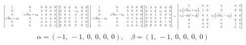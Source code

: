 \documentclass[11pt]{article}
\theoremstyle{definition}
\begin{document}
\[
\scaletoalign{\textwidth}{{\left[\begin{matrix}1 & 0 & 0 & 0 & 0 & 0\\0 & 1 & 0 & 0 & 0 & 0\\0 & - \sqrt{d} u_{1} + u_{0} & 1 & 0 & 0 & 0\\\sqrt{d} u_{1} + u_{0} & 0 & 0 & 1 & 0 & 0\\0 & 0 & 0 & 0 & 1 & 0\\0 & 0 & 0 & 0 & 0 & 1\end{matrix}\right]} {\left[\begin{matrix}1 & 0 & 0 & 0 & 0 & 0\\0 & 1 & 0 & - v_{0} & 0 & 0\\0 & 0 & 1 & 0 & 0 & 0\\0 & 0 & 0 & 1 & 0 & 0\\0 & 0 & 0 & 0 & 1 & 0\\0 & 0 & 0 & 0 & 0 & 1\end{matrix}\right]} {\left[\begin{matrix}1 & 0 & 0 & 0 & 0 & 0\\0 & 1 & 0 & 0 & 0 & 0\\0 & \sqrt{d} u_{1} - u_{0} & 1 & 0 & 0 & 0\\- \sqrt{d} u_{1} - u_{0} & 0 & 0 & 1 & 0 & 0\\0 & 0 & 0 & 0 & 1 & 0\\0 & 0 & 0 & 0 & 0 & 1\end{matrix}\right]} {\left[\begin{matrix}1 & 0 & 0 & 0 & 0 & 0\\0 & 1 & 0 & v_{0} & 0 & 0\\0 & 0 & 1 & 0 & 0 & 0\\0 & 0 & 0 & 1 & 0 & 0\\0 & 0 & 0 & 0 & 1 & 0\\0 & 0 & 0 & 0 & 0 & 1\end{matrix}\right]} = {\left[\begin{matrix}1 & 0 & 0 & 0 & 0 & 0\\v_{0} \left(\sqrt{d} u_{1} + u_{0}\right) & 1 & 0 & 0 & 0 & 0\\v_{0} \left(- d u_{1}^{2} + u_{0}^{2}\right) & 0 & 1 & v_{0} \left(\sqrt{d} u_{1} - u_{0}\right) & 0 & 0\\0 & 0 & 0 & 1 & 0 & 0\\0 & 0 & 0 & 0 & 1 & 0\\0 & 0 & 0 & 0 & 0 & 1\end{matrix}\right]}}
\]
\[
\alpha = \left( -1, \  -1, \  0, \  0, \  0, \  0\right), \quad \beta = \left( 1, \  -1, \  0, \  0, \  0, \  0\right)
\]
\end{document}
